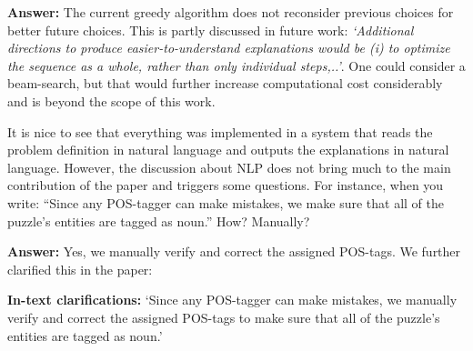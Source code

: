 \documentclass{article}
\newcommand\comment[1]{\marginpar{\tiny #1}}
\renewcommand\comment[1]{#1}
\newcommand{\tias}[1]{{\comment{\color{blue}\textsc{TG:}#1}}}
\newcommand{\emilio}[1]{{\comment{\color{red} \textsc{EG:}#1}}}
\newcommand{\answer}[1]{{\comment{\textbf{Answer:} #1}}}
\newcommand{\clarification}[1]{{\comment{\textbf{In-text clarifications:} #1}}}
\begin{document}
	\answer{
	The current greedy algorithm does not reconsider previous choices for better future choices. This is partly discussed in future work: \emph{`Additional directions to produce easier-to-understand explanations would be \emph{(i)} to  optimize the sequence as a whole, rather than only individual steps,..'}. One could consider a beam-search, but that would further increase computational cost considerably and is beyond the scope of this work.}

\begin{quoteit}
It is nice to see that everything was implemented in a system that reads the problem definition in natural language and outputs the explanations in natural language. However, the discussion about NLP does not bring much to the main contribution of the paper and triggers some questions.
For instance, when you write: ``Since any POS-tagger can make mistakes, we make sure that all of the puzzle's entities are tagged as noun.'' How? Manually?
\end{quoteit}

\answer{Yes, we manually verify and correct the assigned POS-tags. We further clarified this in the paper:}

\clarification{`Since any POS-tagger can make mistakes, we manually verify and correct the assigned POS-tags to make sure that all of the puzzle’s entities are tagged as noun.'}
\end{document}
